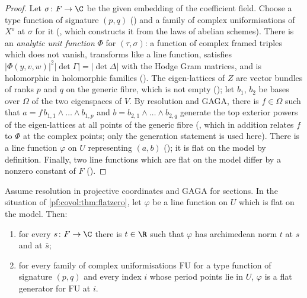 \begin{proof}
Let $\sigma\colon F\to\C$ be the given embedding of the coefficient field. Choose a type function of
signature $(p,q)$ () and a family of complex
uniformisations of $X^o$ at $\sigma$ for it (, which constructs it
from the laws of abelian schemes). There is an \emph{analytic unit function} $\Phi$ for $(\tau,\sigma)$: a
function of complex framed triples which does not vanish, transforms like a line function, satisfies
$|\Phi(y,v,w)|^2|\det\Gamma|=|\det\Delta|$ with the Hodge Gram matrices, and is holomorphic in holomorphic
families (). The eigen-lattices of $Z$ are vector
bundles of ranks $p$ and $q$ on the generic fibre, which is not empty
(); let $b_1$, $b_2$ be bases over $\Omega$ of the two
eigenspaces of $V$. By resolution and GAGA, there is $f\in\Omega$ such that $a=f\,b_{1,1}\wedge\dots\wedge
b_{1,p}$ and $b=b_{2,1}\wedge\dots\wedge b_{2,q}$ generate the top exterior powers of the eigen-lattices at
all points of the generic fibre (, which in addition relates
$f$ to $\Phi$ at the complex points; only the generation statement is used here). There is a line function
$\varphi$ on $U$ representing $(a,b)$ (); it is flat on
the model by definition. Finally, two line functions which are flat on the model differ by a nonzero
constant of $F$ ().
\end{proof}

\begin{theorem}\label{pf:covol:thm:flatfirst}
Assume resolution in projective coordinates and GAGA for sections. In the situation of
\cref{pf:covol:thm:flatzero}, let $\varphi$ be a line function on $U$ which is flat on the model. Then:
\begin{enumerate}[label=(\alph*)]
\item for every $s\colon F\to\C$ there is $t\in\R$ such that $\varphi$ has archimedean norm $t$ at $s$ and at
  $\bar s$;
\item for every family of complex uniformisations $\mathrm{FU}$ for a type function of signature $(p,q)$ and
  every index $i$ whose period points lie in $U$, $\varphi$ is a flat generator for $\mathrm{FU}$ at $i$.
\end{enumerate}
\end{theorem}

